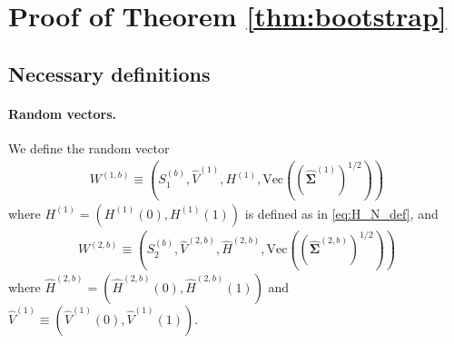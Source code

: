 \documentclass[12pt]{article}
\begin{document}
\section{Proof of Theorem \ref{thm:bootstrap}}\label{sec:proof_bootstrap}

\subsection{Necessary definitions}

\paragraph{Random vectors.} We define the random vector 	
\begin{align*}
	W^{(1,b)}\equiv \left(S_1^{(b)}, \hat V^{(1)}, H^{(1)},\mathrm{Vec}((\hat{\bm\Sigma}^{(1)})^{1/2})\right)
\end{align*}
where $H^{(1)}=(H^{(1)}(0),H^{(1)}(1))$ is defined as in \eqref{eq:H_N_def}, and 
\begin{align*}
	W^{(2,b)}\equiv \left(S_2^{(b)}, \hat V^{(2,b)}, \hat H^{(2,b)},\mathrm{Vec}((\hat{\bm\Sigma}^{(2,b)})^{1/2})\right)
\end{align*}	
where $\hat H^{(2,b)}=(\hat H^{(2,b)}(0),\hat H^{(2,b)}(1))$ and $\hat{V}^{(1)}\equiv (\hat{V}^{(1)}(0),\hat{V}^{(1)}(1))$. 
\end{document}
